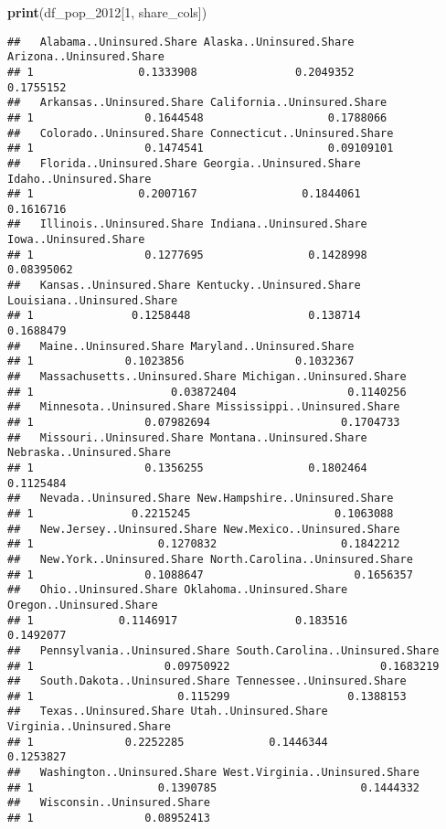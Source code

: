 \documentclass[
]{article}
\newenvironment{Shaded}{\begin{snugshade}}{\end{snugshade}}
\newcommand{\DecValTok}[1]{\textcolor[rgb]{0.00,0.00,0.81}{#1}}
\newcommand{\FunctionTok}[1]{\textcolor[rgb]{0.13,0.29,0.53}{\textbf{#1}}}
\newcommand{\NormalTok}[1]{#1}
\begin{document}
\begin{Shaded}
\begin{Highlighting}[]
\FunctionTok{print}\NormalTok{(df\_pop\_2012[}\DecValTok{1}\NormalTok{, share\_cols])}
\end{Highlighting}
\end{Shaded}

\begin{verbatim}
##   Alabama..Uninsured.Share Alaska..Uninsured.Share Arizona..Uninsured.Share
## 1                0.1333908               0.2049352                0.1755152
##   Arkansas..Uninsured.Share California..Uninsured.Share
## 1                 0.1644548                   0.1788066
##   Colorado..Uninsured.Share Connecticut..Uninsured.Share
## 1                 0.1474541                   0.09109101
##   Florida..Uninsured.Share Georgia..Uninsured.Share Idaho..Uninsured.Share
## 1                0.2007167                0.1844061              0.1616716
##   Illinois..Uninsured.Share Indiana..Uninsured.Share Iowa..Uninsured.Share
## 1                 0.1277695                0.1428998            0.08395062
##   Kansas..Uninsured.Share Kentucky..Uninsured.Share Louisiana..Uninsured.Share
## 1               0.1258448                  0.138714                  0.1688479
##   Maine..Uninsured.Share Maryland..Uninsured.Share
## 1              0.1023856                 0.1032367
##   Massachusetts..Uninsured.Share Michigan..Uninsured.Share
## 1                     0.03872404                 0.1140256
##   Minnesota..Uninsured.Share Mississippi..Uninsured.Share
## 1                 0.07982694                    0.1704733
##   Missouri..Uninsured.Share Montana..Uninsured.Share Nebraska..Uninsured.Share
## 1                 0.1356255                0.1802464                 0.1125484
##   Nevada..Uninsured.Share New.Hampshire..Uninsured.Share
## 1               0.2215245                      0.1063088
##   New.Jersey..Uninsured.Share New.Mexico..Uninsured.Share
## 1                   0.1270832                   0.1842212
##   New.York..Uninsured.Share North.Carolina..Uninsured.Share
## 1                 0.1088647                       0.1656357
##   Ohio..Uninsured.Share Oklahoma..Uninsured.Share Oregon..Uninsured.Share
## 1             0.1146917                  0.183516               0.1492077
##   Pennsylvania..Uninsured.Share South.Carolina..Uninsured.Share
## 1                    0.09750922                       0.1683219
##   South.Dakota..Uninsured.Share Tennessee..Uninsured.Share
## 1                      0.115299                  0.1388153
##   Texas..Uninsured.Share Utah..Uninsured.Share Virginia..Uninsured.Share
## 1              0.2252285             0.1446344                 0.1253827
##   Washington..Uninsured.Share West.Virginia..Uninsured.Share
## 1                   0.1390785                      0.1444332
##   Wisconsin..Uninsured.Share
## 1                 0.08952413
\end{verbatim}
\end{document}
